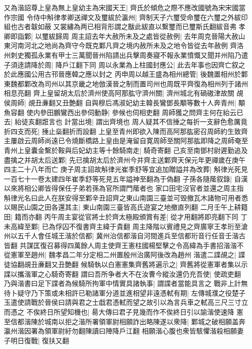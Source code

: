 又為湝詔尊上皇為無上皇幼主為宋國天王|{
	齊氏於傾危之際不應改國號為宋宋國當作宗國}
令侍中斛律孝卿送禪文及璽紱於瀛州|{
	齊制天子六璽受命璽在六璽之外紱印組也古者韍如蔽又裳繡為两已相背形謂之黻此紱直以繫璽而已璽斯氏翻紱音弗}
孝卿即詣鄴|{
	以璽紱歸周}
周主詔去年大赦所未及之處皆從赦例|{
	去年周克晉陽大赦山東河南河北之地尚為齊守今既克鄴凡齊之境内赦所未及之地令皆從去年赦例}
齊洛州刺史獨孤永業有甲士三萬聞晉州陷請出兵擊周奏寢不報永業憤慨又聞并州陷乃遣子須逹請降於周|{
	降戶江翻下同}
周以永業為上柱國封應公|{
	此去年事也因齊亡叙之於此應國公用古邗晉應韓之應以封之}
丙申周以越王盛為相州總管|{
	後魏置相州於鄴東魏都鄴改為司州以其京畿之地倣漢晉之制而置司州也周既平齊復為相州列于諸州相息亮翻}
齊上皇留胡太后於濟州使高阿那肱守濟州關|{
	濟州城北有碢磝津故關}
覘侯周師|{
	覘丑亷翻又丑艶翻}
自與穆后馮淑妃幼主韓長鸞鄧長顒等數十人奔青州|{
	顒魚容翻}
使内參田鵬鸞西出參伺動静|{
	參候也伺相吏翻}
周師獲之問齊主何在紿云已去|{
	紿徒亥翻誑言也}
計當出境|{
	謂出齊境也}
周人疑其不信捶之每折一支辭色愈厲竟折四支而死|{
	捶止橤翻折而設翻}
上皇至青州即欲入陳而高阿那肱密召周師約生致齊主屢啟云周師尚遠已令燒斷橋路上皇由是淹留自寛周師至關阿那肱即降之周師奄至青州上皇囊金繫於鞍與后妃幼主等十餘騎南走|{
	騎奇寄翻}
己亥至南鄧村尉遲勤追及盡擒之并胡太后送鄴|{
	先已擒胡太后於濟州今并齊主送鄴齊天保元年更禪歲在庚午四主二十八年而亡}
庚子周主詔故斛律光崔季舒等宜追加贈謚并為改葬|{
	斛律光死見一百七十一卷太建四年崔季舒等死見五年謚神至翻為于偽翻}
子孫各隨䕃叙錄|{
	自漢以來將相公卿皆得保任子弟若孫為官所謂門䕃者也}
家口田宅沒官者並還之周主指斛律光名曰此人在朕安得至鄴辛丑詔齊之東山南園三臺並可毁撤瓦木諸物可用者悉以賜民山園之田各還其主|{
	東山南園三臺皆高氏遊宴之地撤直列翻}
二月壬午上耕籍田|{
	籍而亦翻}
丙午周主宴從官將士於齊太極殿頒賞有差|{
	從才用翻將即亮翻下同}
丁未高緯至鄴|{
	已為俘囚不復書齊主緯于貴翻}
周主降階以賓禮見之齊廣寧王孝珩至滄州以五千人會任城王湝於信都|{
	冀州治信都湝自河間進兵至信都珩音行任音壬湝古皆翻}
共謀匡復召募得四萬餘人周主使齊王憲柱國楊堅擊之令高緯為手書招湝湝不從憲軍至趙州|{
	魏孝昌二年分定相二州置殷州治廣阿後改為趙州}
湝遣二諜覘之|{
	諜徒協翻覘丑亷翻又丑艶翻}
候騎執以白憲憲集齊舊將遍示之|{
	齊舊將從憲軍者集以示諜以攜湝軍之心騎奇寄翻}
謂曰吾所争者大不在汝曹今縱汝還仍充吾使|{
	使疏吏翻}
乃與湝書曰足下諜者為候騎所拘軍中情實具諸執事|{
	謂諜者當能具言之}
戰非上計無待卜疑守乃下策或未相許已勒諸軍分道並進相望非遠憑軾有期|{
	左傳城濮之役楚子玉遣使請戰於晉侯曰請與君之士戱君憑軾而望之故引以為言兵車之軾高三尺三寸立而憑之}
不俟終日所望知機也|{
	昜大傳曰君子見幾而作不俟終日引以諭湝使速降}
憲至信都湝陳於城南以拒之湝所署領軍尉相願詐出略陳遂以衆降|{
	鄴城之破相願盖奔瀛州湝因署為領軍尉紆勿翻陳讀曰陣降戶江翻}
相願湝心腹也衆皆駭懼湝殺相願妻子明日復戰|{
	復扶又翻}
